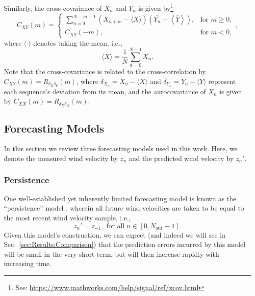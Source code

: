 \documentclass[11pt, oneside]{article}
\newcommand{\secref}[1]{Sec.~\ref{#1}}
\begin{document}
Similarly, the cross-covariance of $X_n$ and $Y_n$ is given by\footnote{See: \url{https://www.mathworks.com/help/signal/ref/xcov.html}}
\begin{equation}\label{eq:xcov}
C_{XY}(m) = 
\begin{cases}
\displaystyle \sum_{n=0}^{N-m-1} \left( X_{n+m} - \langle X \rangle \right) \left( \overline{Y_n} - \left\langle \overline{Y} \right\rangle \right), & \text{for } m \geq 0,\\[20pt]
\overline{C_{XY}}(-m), & \text{for } m < 0,
\end{cases},
\end{equation}
where $\langle \cdot \rangle$ denotes taking the mean, i.e.,
\begin{equation}
\langle X \rangle = \frac{1}{N} \sum_{n = 0}^{N-1} X_n.
\end{equation}
Note that the cross-covariance is related to the cross-correlation by $C_{XY}(m) = R_{\delta_X \delta_Y}(m)$, where $\delta_{X_n} = X_n - \langle X \rangle$ and $\delta_{Y_n} = Y_n - \langle Y \rangle$ represent each sequence's deviation from its mean, and the autocovariance of $X_n$ is given by $C_{XX}(m) = R_{\delta_X \delta_X}(m)$.

\subsection{Forecasting Models}\label{sec:Models}
In this section we review three forecasting models used in this work.
Here, we denote the measured wind velocity by $z_n$ and the predicted wind velocity by $z_n'$.

\subsubsection{Persistence}
One well-established yet inherently limited forecasting model is known as the ``persistence'' model \citep[Sec.~1.5]{Giebel2011}, wherein all future wind velocities are taken to be equal to the most recent wind velocity sample, i.e.,
\begin{equation}
z_n' = z_{-1}, \text{ for all } n \in [0, N_\text{out} - 1].
\end{equation}
Given this model's construction, we can expect (and indeed we will see in \secref{sec:Results:Comparison}) that the prediction errors incurred by this model will be small in the very short-term, but will then increase rapidly with increasing time.
\end{document}

